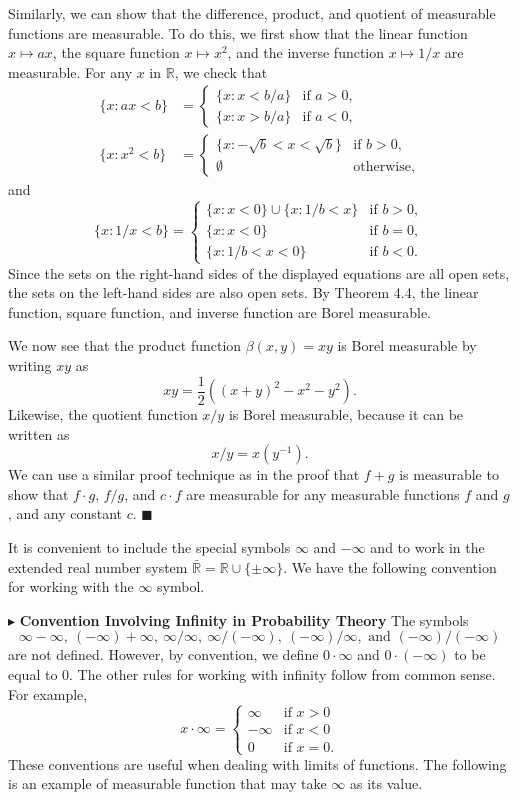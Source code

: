 Similarly, we can show that the difference, product, and quotient of measurable functions are measurable. To do this, we first show that the linear function $x \mapsto ax$, the square function $x \mapsto x^2$, and the inverse function $x \mapsto 1/x$ are measurable. For any $x$ in $\mathbb{R}$, we check that
\begin{align*}
\{x : ax < b\} &= \begin{cases} \{x : x < b/a\} & \text{if } a > 0, \\ \{x : x > b/a\} & \text{if } a < 0, \end{cases} \\
\{x : x^2 < b\} &= \begin{cases} \{x : -\sqrt{b} < x < \sqrt{b}\} & \text{if } b > 0, \\ \emptyset & \text{otherwise,} \end{cases}
\end{align*}
and
\[
\{x : 1/x < b\} = \begin{cases} \{x : x < 0\} \cup \{x : 1/b < x\} & \text{if } b > 0, \\ \{x : x < 0\} & \text{if } b = 0, \\ \{x : 1/b < x < 0\} & \text{if } b < 0. \end{cases}
\]
Since the sets on the right-hand sides of the displayed equations are all open sets, the sets on the left-hand sides are also open sets. By Theorem 4.4, the linear function, square function, and inverse function are Borel measurable.

We now see that the product function $\beta(x, y) = xy$ is Borel measurable by writing $xy$ as
\[
xy = \frac{1}{2}((x + y)^2 - x^2 - y^2).
\]
Likewise, the quotient function $x/y$ is Borel measurable, because it can be written as
\[
x/y = x(y^{-1}).
\]
We can use a similar proof technique as in the proof that $f + g$ is measurable to show that $f \cdot g$, $f/g$, and $c \cdot f$ are measurable for any measurable functions $f$ and $g$, and any constant $c$. \hfill $\blacksquare$

It is convenient to include the special symbols $\infty$ and $-\infty$ and to work in the extended real number system $\bar{\mathbb{R}} = \mathbb{R} \cup \{\pm\infty\}$. We have the following convention for working with the $\infty$ symbol.

\noindent$\blacktriangleright$ \textbf{Convention Involving Infinity in Probability Theory} The symbols 
\[
\infty - \infty, \ (-\infty) + \infty, \ \infty/\infty, \ \infty/(-\infty), \ (-\infty)/\infty, \text{ and } (-\infty)/(-\infty)
\]
are not defined. However, by convention, we define $0 \cdot \infty$ and $0 \cdot (-\infty)$ to be equal to 0. The other rules for working with infinity follow from common sense. For example,
\[
x \cdot \infty = \begin{cases} \infty & \text{if } x > 0 \\ -\infty & \text{if } x < 0 \\ 0 & \text{if } x = 0. \end{cases}
\]
These conventions are useful when dealing with limits of functions. The following is an example of measurable function that may take $\infty$ as its value.

